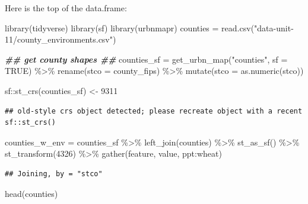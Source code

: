 \documentclass[
]{book}
\newenvironment{Shaded}{\begin{snugshade}}{\end{snugshade}}
\newcommand{\AttributeTok}[1]{\textcolor[rgb]{0.77,0.63,0.00}{#1}}
\newcommand{\ConstantTok}[1]{\textcolor[rgb]{0.00,0.00,0.00}{#1}}
\newcommand{\DecValTok}[1]{\textcolor[rgb]{0.00,0.00,0.81}{#1}}
\newcommand{\DocumentationTok}[1]{\textcolor[rgb]{0.56,0.35,0.01}{\textbf{\textit{#1}}}}
\newcommand{\FunctionTok}[1]{\textcolor[rgb]{0.00,0.00,0.00}{#1}}
\newcommand{\NormalTok}[1]{#1}
\newcommand{\OtherTok}[1]{\textcolor[rgb]{0.56,0.35,0.01}{#1}}
\newcommand{\SpecialCharTok}[1]{\textcolor[rgb]{0.00,0.00,0.00}{#1}}
\newcommand{\StringTok}[1]{\textcolor[rgb]{0.31,0.60,0.02}{#1}}
\begin{document}
Here is the top of the data.frame:

\begin{Shaded}
\begin{Highlighting}[]
\FunctionTok{library}\NormalTok{(tidyverse)}
\FunctionTok{library}\NormalTok{(sf)}
\FunctionTok{library}\NormalTok{(urbnmapr)}
\NormalTok{counties }\OtherTok{=} \FunctionTok{read.csv}\NormalTok{(}\StringTok{"data{-}unit{-}11/county\_environments.csv"}\NormalTok{)}

\DocumentationTok{\#\# get county shapes \#\#}
\NormalTok{counties\_sf }\OtherTok{=} \FunctionTok{get\_urbn\_map}\NormalTok{(}\StringTok{"counties"}\NormalTok{, }\AttributeTok{sf =} \ConstantTok{TRUE}\NormalTok{) }\SpecialCharTok{\%\textgreater{}\%}
    \FunctionTok{rename}\NormalTok{(}\AttributeTok{stco =}\NormalTok{ county\_fips) }\SpecialCharTok{\%\textgreater{}\%}
    \FunctionTok{mutate}\NormalTok{(}\AttributeTok{stco =} \FunctionTok{as.numeric}\NormalTok{(stco))}

\NormalTok{sf}\SpecialCharTok{::}\FunctionTok{st\_crs}\NormalTok{(counties\_sf) }\OtherTok{\textless{}{-}} \DecValTok{9311}
\end{Highlighting}
\end{Shaded}

\begin{verbatim}
## old-style crs object detected; please recreate object with a recent sf::st_crs()
\end{verbatim}

\begin{Shaded}
\begin{Highlighting}[]
\NormalTok{counties\_w\_env }\OtherTok{=}\NormalTok{ counties\_sf }\SpecialCharTok{\%\textgreater{}\%}
  \FunctionTok{left\_join}\NormalTok{(counties) }\SpecialCharTok{\%\textgreater{}\%}
  \FunctionTok{st\_as\_sf}\NormalTok{() }\SpecialCharTok{\%\textgreater{}\%}
  \FunctionTok{st\_transform}\NormalTok{(}\DecValTok{4326}\NormalTok{) }\SpecialCharTok{\%\textgreater{}\%}
  \FunctionTok{gather}\NormalTok{(feature, value, ppt}\SpecialCharTok{:}\NormalTok{wheat)}
\end{Highlighting}
\end{Shaded}

\begin{verbatim}
## Joining, by = "stco"
\end{verbatim}

\begin{Shaded}
\begin{Highlighting}[]
\FunctionTok{head}\NormalTok{(counties)}
\end{Highlighting}
\end{Shaded}
\end{document}
